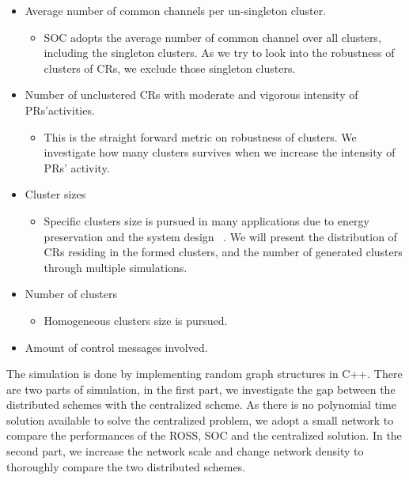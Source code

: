 \begin{itemize}
\item Average number of common channels per un-singleton cluster. 
\begin{itemize}
\item SOC adopts the average number of common channel over all clusters, \ie including the singleton clusters. As we try to look into the robustness of clusters of CRs, we exclude those singleton clusters.
\end{itemize}  

\item Number of unclustered CRs with moderate and vigorous intensity of PRs'activities.
\begin{itemize}
\item This is the straight forward metric on robustness of clusters.
We investigate how many clusters survives when we increase the intensity of PRs' activity.
\end{itemize}

\item Cluster sizes 
\begin{itemize}
\item Specific clusters size is pursued in many applications due to energy preservation and the system design ~\cite{clustering_globecom11}.
We will present the distribution of CRs residing in the formed clusters, and the number of generated clusters through multiple simulations.
\end{itemize}

\item Number of clusters	
\begin{itemize}
\item Homogeneous clusters size is pursued.
\end{itemize}

\item Amount of control messages involved.
\end{itemize}

The simulation is done by implementing random graph structures in C++. 
There are two parts of simulation, in the first part, we investigate the gap between the distributed schemes with the centralized scheme.
As there is no polynomial time solution available to solve the centralized problem, we adopt a small network to compare the performances of the ROSS, SOC and the centralized solution.
In the second part, we increase the network scale and change network density to thoroughly compare the two distributed schemes.
